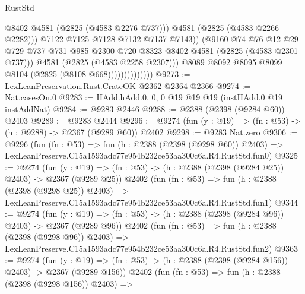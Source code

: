\begin{lexlean}{RustStd}
\begin{coremodule}
                                      @8402
                                      @4581
                                      (@2825 (@4583 @2276 @737)))
                                    @4581
                                    (@2825 (@4583 @2266 @2282)))
                                  @7122
                                  @7125
                                  @7128
                                  @7132
                                  @7137
                                  @7143))
                              (@9160
                                @74
                                @76
                                @12
                                @29
                                @729
                                @737
                                @731
                                @985
                                @2300
                                @720
                                @8323
                                @8402
                                @4581
                                (@2825 (@4583 @2301 @737)))
                              @4581
                              (@2825 (@4583 @2258 @2307)))
                            @8089
                            @8092
                            @8095
                            @8099
                            @8104
                            (@2825 (@8108 @668))))))))))))))
@9273 := LexLeanPreservation.Rust.CrateOK @2362 @2364 @2366
@9274 := Nat.casesOn.{0}
@9283 := HAdd.hAdd.{0, 0, 0} @19 @19 @19 (instHAdd.{0} @19 instAddNat)
@9284 := @9283 @2446
@9288 := @2388 (@2398 (@9284 @60)) @2403
@9289 := @9283 @2444
@9296 := @9274 (fun (y : @19) => (fn : @53) -> (h : @9288) -> @2367 (@9289 @60)) @2402
@9298 := @9283 Nat.zero
@9306 := @9296
    (fun (fn : @53) =>
    fun (h : @2388 (@2398 (@9298 @60)) @2403) =>
    LexLeanPreserve.C15a1593adc77e954b232ce53aa300c6a.R4.RustStd.fun0)
@9325 := @9274
    (fun (y : @19) => (fn : @53) -> (h : @2388 (@2398 (@9284 @25)) @2403) -> @2367 (@9289 @25))
    @2402
    (fun (fn : @53) =>
    fun (h : @2388 (@2398 (@9298 @25)) @2403) =>
    LexLeanPreserve.C15a1593adc77e954b232ce53aa300c6a.R4.RustStd.fun1)
@9344 := @9274
    (fun (y : @19) => (fn : @53) -> (h : @2388 (@2398 (@9284 @96)) @2403) -> @2367 (@9289 @96))
    @2402
    (fun (fn : @53) =>
    fun (h : @2388 (@2398 (@9298 @96)) @2403) =>
    LexLeanPreserve.C15a1593adc77e954b232ce53aa300c6a.R4.RustStd.fun2)
@9363 := @9274
    (fun (y : @19) => (fn : @53) -> (h : @2388 (@2398 (@9284 @156)) @2403) -> @2367 (@9289 @156))
    @2402
    (fun (fn : @53) =>
    fun (h : @2388 (@2398 (@9298 @156)) @2403) =>

\end{coremodule}
\end{lexlean}
